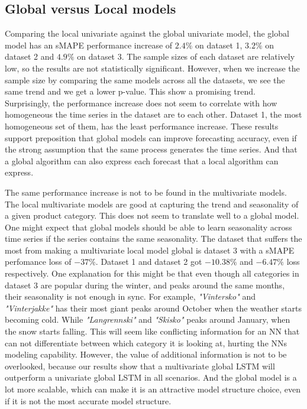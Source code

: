 

\subsection{Global versus Local models}
\label{section:Discussion:Discussion:Global-v-local}

Comparing the local univariate against the global univariate model,
the global model has an sMAPE performance increase of $2.4\%$ on dataset 1, $3.2\%$ on dataset 2 and
$4.9\%$ on dataset 3. The sample sizes of each dataset are relatively low, so the results are not statistically significant.
However, when we increase the sample size by comparing the same models across all the datasets, we see the same trend and we get a lower
p-value. This show a promising trend.
Surprisingly, the performance increase does not seem to correlate
with how homogeneous the time series in the dataset are to each other.
Dataset 1, the most homogeneous set of them, has the least performance increase.
These results support \cite{Montero-Manso2021} preposition that global models can
improve forecasting accuracy, even if the strong assumption that the same process generates the time series.
And that a global algorithm can also express each forecast that a local algorithm can express.

The same performance increase is not to be found in the multivariate models.
The local multivariate models are good at capturing the trend and seasonality of
a given product category. This does not seem to translate well to a global model.
One might expect that global models should be able to learn seasonality across
time series if the series contains the same seasonality.
The dataset that suffers the most from making a multivariate local model global is dataset 3
with a sMAPE perfomance loss of $-37\%$. Dataset 1 and dataset 2 got $-10.38\%$ and $-6.47\%$ loss
respectively.
One explanation for this might be that even though all categories in dataset 3 are popular during the
winter, and peaks around the same months, their seasonality is not enough in sync.
For example, \textit{"Vintersko"} and \textit{"Vinterjakke"} has their most giant peaks around October
when the weather starts becoming cold. While \textit{"Langrennski"} and \textit{"Skisko"}
peaks around January, when the snow starts falling.
This will seem like conflicting information for an NN that can not differentiate between
which category it is looking at, hurting the NNs modeling capability.
However, the value of additional information is not to be overlooked,
because our results show that a multivariate global LSTM will outperform
a univariate global LSTM in all scenarios.
And the global model is a lot more scalable, which can make
it is an attractive model structure choice, even if it is not the most
accurate model structure.

